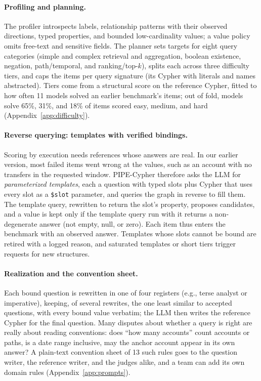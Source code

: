 \documentclass[11pt]{article}
\newcommand{\cy}[1]{\texttt{\small #1}}
\begin{document}
\paragraph{Profiling and planning.} The profiler introspects labels, relationship patterns with their observed directions, typed properties, and bounded low-cardinality values; a value policy omits free-text and sensitive fields. The planner sets targets for eight query categories (simple and complex retrieval and aggregation, boolean existence, negation, path/temporal, and ranking/top-$k$), splits each across three difficulty tiers, and caps the items per query signature (its Cypher with literals and names abstracted). Tiers come from a structural score on the reference Cypher, fitted to how often 11 models solved an earlier benchmark's items; out of fold, models solve 65\%, 31\%, and 18\% of items scored easy, medium, and hard (Appendix~\ref{app:difficulty}).

\paragraph{Reverse querying: templates with verified bindings.} Scoring by execution needs references whose answers are real. In our earlier version, most failed items went wrong at the values, such as an account with no transfers in the requested window. PIPE-Cypher therefore asks the LLM for \emph{parameterized templates}, each a question with typed slots plus Cypher that uses every slot as a \cy{\$slot} parameter, and queries the graph in reverse to fill them. The template query, rewritten to return the slot's property, proposes candidates, and a value is kept only if the template query run with it returns a non-degenerate answer (not empty, null, or zero). Each item thus enters the benchmark with an observed answer. Templates whose slots cannot be bound are retired with a logged reason, and saturated templates or short tiers trigger requests for new structures.

\paragraph{Realization and the convention sheet.} Each bound question is rewritten in one of four registers (e.g., terse analyst or imperative), keeping, of several rewrites, the one least similar to accepted questions, with every bound value verbatim; the LLM then writes the reference Cypher for the final question. Many disputes about whether a query is right are really about reading conventions: does ``how many accounts'' count accounts or paths, is a date range inclusive, may the anchor account appear in its own answer? A plain-text convention sheet of 13 such rules goes to the question writer, the reference writer, and the judges alike, and a team can add its own domain rules (Appendix~\ref{app:prompts}).
\end{document}

